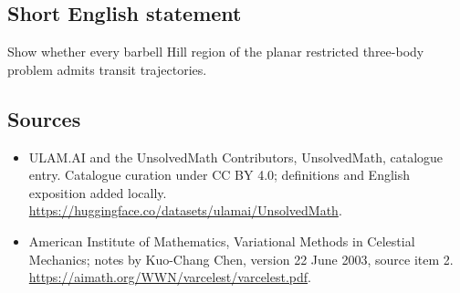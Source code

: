 \documentclass[11pt]{article}
\begin{document}
\subsection{Short English statement}
Show whether every barbell Hill region of the planar restricted three-body problem admits transit trajectories.
\subsection{Sources}
\begin{itemize}
\item[\hypertarget{source:statement:1}{S1}] ULAM.AI and the UnsolvedMath Contributors, UnsolvedMath, catalogue entry. Catalogue curation under CC BY 4.0; definitions and English exposition added locally.
\url{https://huggingface.co/datasets/ulamai/UnsolvedMath}.
\item[\hypertarget{source:statement:2}{S2}] American Institute of Mathematics, Variational Methods in Celestial Mechanics; notes by Kuo-Chang Chen, version 22 June 2003, source item 2.
\url{https://aimath.org/WWN/varcelest/varcelest.pdf}.
\end{itemize}
\label{end:statement}
\end{document}
